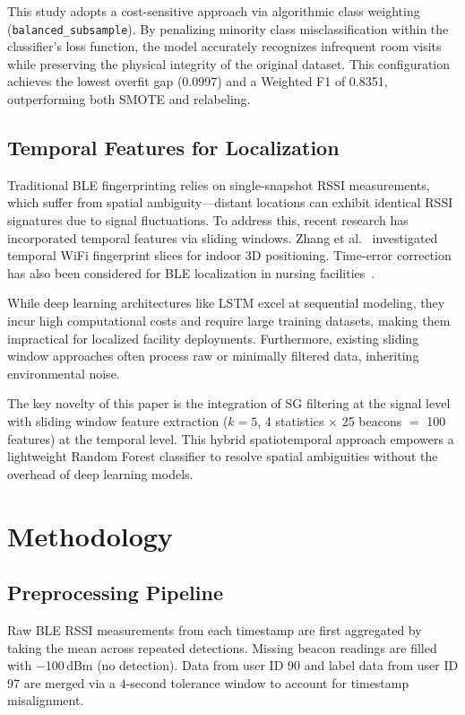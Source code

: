 \documentclass{iopconfser}
\begin{document}
This study adopts a cost-sensitive approach via algorithmic class weighting (\texttt{balanced\_\allowbreak subsample}). By penalizing minority class misclassification within the classifier's loss function, the model accurately recognizes infrequent room visits while preserving the physical integrity of the original dataset. This configuration achieves the lowest overfit gap (0.0997) and a Weighted F1 of 0.8351, outperforming both SMOTE and relabeling.

\subsection{Temporal Features for Localization}

Traditional BLE fingerprinting relies on single-snapshot RSSI measurements, which suffer from spatial ambiguity—distant locations can exhibit identical RSSI signatures due to signal fluctuations. To address this, recent research has incorporated temporal features via sliding windows. Zhang et al.~\cite{sensors2023} investigated temporal WiFi fingerprint slices for indoor 3D positioning. Time-error correction has also been considered for BLE localization in nursing facilities~\cite{okuda2024}.

While deep learning architectures like LSTM excel at sequential modeling, they incur high computational costs and require large training datasets, making them impractical for localized facility deployments. Furthermore, existing sliding window approaches often process raw or minimally filtered data, inheriting environmental noise.

The key novelty of this paper is the integration of SG filtering at the signal level with sliding window feature extraction ($k=5$, 4 statistics $\times$ 25 beacons $=$ 100 features) at the temporal level. This hybrid spatiotemporal approach empowers a lightweight Random Forest classifier to resolve spatial ambiguities without the overhead of deep learning models.


\section{Methodology}
\label{sec:method}

\subsection{Preprocessing Pipeline}

Raw BLE RSSI measurements from each timestamp are first aggregated by taking the mean across repeated detections. Missing beacon readings are filled with $-$100\,dBm (no detection). Data from user ID 90 and label data from user ID 97 are merged via a 4-second tolerance window to account for timestamp misalignment.
\end{document}
